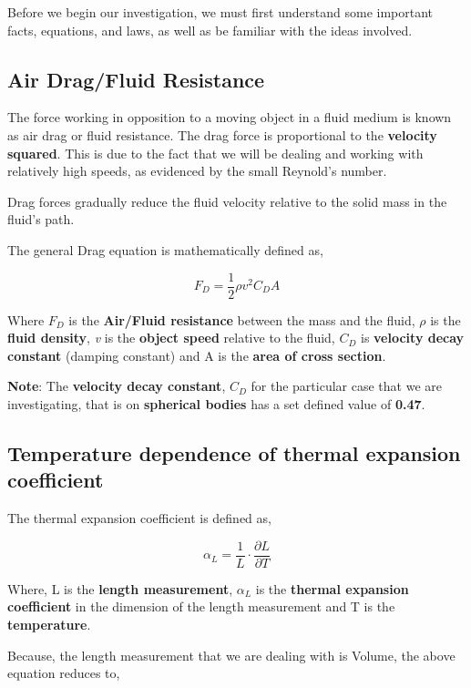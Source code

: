 {Before we begin our investigation, we must first understand some important facts, equations, and laws, as well as be familiar with the ideas involved.}
        
\subsection{{Air Drag/Fluid Resistance}}
        
    {The force working in opposition to a moving object in a fluid medium is known as air drag or fluid resistance. The drag force is proportional to the \textbf{velocity squared}. This is due to the fact that we will be dealing and working with relatively high speeds, as evidenced by the small Reynold's number.}
            
    {Drag forces gradually reduce the fluid velocity relative to the solid mass in the fluid's path.}
            
    {The general Drag equation is mathematically defined as,}
            
        $$F_D = \frac{1}{2}\rho v^2C_DA$$
           
    {Where $F_D$ is the \textbf{Air/Fluid resistance} between the mass and the fluid, $\rho$ is the \textbf{fluid density}, \textit{v} is the \textbf{object speed} relative to the fluid, $C_D$ is \textbf{velocity decay constant} (damping constant) and A is the \textbf{area of cross section}.}
            
    {\textbf{Note}: The \textbf{velocity decay constant}, $C_D$ for the particular case that we are investigating, that is on \textbf{spherical bodies} has a set defined value of \textbf{0.47}.}
            
\subsection{{Temperature dependence of thermal expansion \\ coefficient}}

	{The thermal expansion coefficient is defined as,}
	
		$$\alpha_{L} = \frac{1}{L}\cdot\frac{\partial L}{\partial T}$$
	
	{Where, L is the \textbf{length measurement}, $\alpha_{L}$ is the \textbf{thermal expansion coefficient} in the dimension of the length measurement and T is the \textbf{temperature}.}	
	
	{Because, the length measurement that we are dealing with is Volume, the above equation reduces to,}

